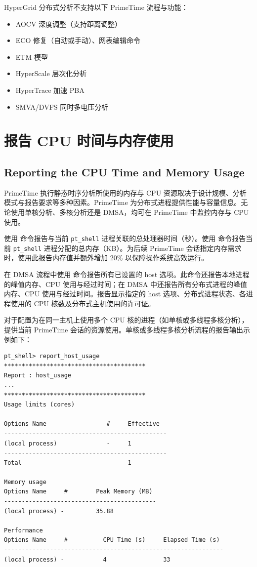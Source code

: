 HyperGrid 分布式分析不支持以下 PrimeTime 流程与功能：
\begin{itemize}
  \item AOCV 深度调整（支持距离调整）
  \item ECO 修复（自动或手动）、网表编辑命令
  \item ETM 模型
  \item HyperScale 层次化分析
  \item HyperTrace 加速 PBA
  \item SMVA/DVFS 同时多电压分析
\end{itemize}


\section{报告 CPU 时间与内存使用}
\subsection*{Reporting the CPU Time and Memory Usage}

PrimeTime 执行静态时序分析所使用的内存与 CPU 资源取决于设计规模、分析模式与报告要求等多种因素。PrimeTime 为分布式进程提供性能与容量信息。无论使用单核分析、多核分析还是 DMSA，均可在 PrimeTime 中监控内存与 CPU 使用。

使用  命令报告与当前 \texttt{pt\_shell} 进程关联的总处理器时间（秒）。使用  命令报告当前 \texttt{pt\_shell} 进程分配的总内存（KB）。为后续 PrimeTime 会话指定内存需求时，使用此报告内存值并额外增加 20\% 以保障操作系统高效运行。

在 DMSA 流程中使用  命令报告所有已设置的 host 选项。此命令还报告本地进程的峰值内存、CPU 使用与经过时间；在 DMSA 中还报告所有分布式进程的峰值内存、CPU 使用与经过时间。报告显示指定的 host 选项、分布式进程状态、各进程使用的 CPU 核数及分布式主机使用的许可证。

对于配置为在同一主机上使用多个 CPU 核的进程（如单核或多线程多核分析）， 提供当前 PrimeTime 会话的资源使用。单核或多线程多核分析流程的报告输出示例如下：
\begin{lstlisting}
pt_shell> report_host_usage
****************************************
Report : host_usage
...
****************************************
Usage limits (cores)

Options Name                 #     Effective
----------------------------------------------
(local process)              -     1
----------------------------------------------
Total                              1

Memory usage
Options Name     #        Peak Memory (MB)
-------------------------------------------
(local process) -         35.88

Performance
Options Name     #          CPU Time (s)     Elapsed Time (s)
--------------------------------------------------------------
(local process) -           4                33
\end{lstlisting}

